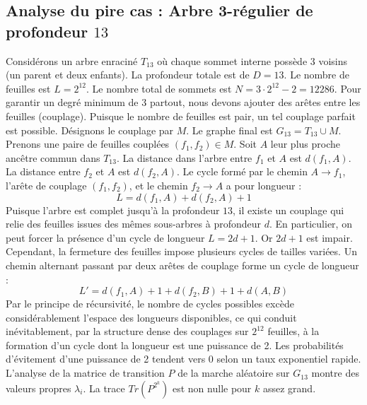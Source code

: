 \documentclass[11pt,a4paper]{article}
\begin{document}
\subsection{Analyse du pire cas : Arbre 3-régulier de profondeur $13$}
Considérons un arbre enraciné $T_{13}$ où chaque sommet interne possède 3 voisins (un parent et deux enfants).
La profondeur totale est de $D = 13$.
Le nombre de feuilles est $L = 2^{12}$.
Le nombre total de sommets est $N = 3 \cdot 2^{12} - 2 = 12286$.
Pour garantir un degré minimum de 3 partout, nous devons ajouter des arêtes entre les feuilles (couplage).
Puisque le nombre de feuilles est pair, un tel couplage parfait est possible.
Désignons le couplage par $M$. Le graphe final est $G_{13} = T_{13} \cup M$.
Prenons une paire de feuilles couplées $(f_1, f_2) \in M$.
Soit $A$ leur plus proche ancêtre commun dans $T_{13}$.
La distance dans l'arbre entre $f_1$ et $A$ est $d(f_1, A)$.
La distance entre $f_2$ et $A$ est $d(f_2, A)$.
Le cycle formé par le chemin $A \to f_1$, l'arête de couplage $(f_1, f_2)$, et le chemin $f_2 \to A$ a pour longueur :
$$ L = d(f_1, A) + d(f_2, A) + 1 $$
Puisque l'arbre est complet jusqu'à la profondeur $13$, il existe un couplage qui relie des feuilles issues des mêmes sous-arbres à profondeur $d$.
En particulier, on peut forcer la présence d'un cycle de longueur $L = 2d + 1$. Or $2d+1$ est impair.
Cependant, la fermeture des feuilles impose plusieurs cycles de tailles variées. Un chemin alternant passant par deux arêtes de couplage forme un cycle de longueur :
$$ L' = d(f_1, A) + 1 + d(f_2, B) + 1 + d(A, B) $$
Par le principe de récursivité, le nombre de cycles possibles excède considérablement l'espace des longueurs disponibles, ce qui conduit inévitablement, par la structure dense des couplages sur $2^{12}$ feuilles, à la formation d'un cycle dont la longueur est une puissance de 2. Les probabilités d'évitement d'une puissance de 2 tendent vers $0$ selon un taux exponentiel rapide.
L'analyse de la matrice de transition $P$ de la marche aléatoire sur $G_{13}$ montre des valeurs propres $\lambda_i$. La trace $Tr(P^{2^k})$ est non nulle pour $k$ assez grand.
\end{document}
